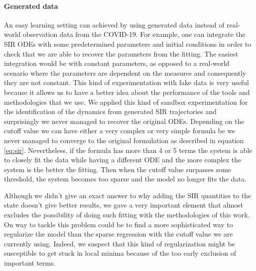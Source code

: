 \documentclass[12pt, letterpaper]{article}
\begin{document}
\paragraph{Generated data}

An easy learning setting can achieved by using generated data instead of real-world observation data from the COVID-19. 
For example, one can integrate the SIR ODEs with some predetermined parameters and initial conditions in order to check that we are able to recover the parameters from the fitting.
The easiest integration would be with constant parameters, as opposed to a real-world scenario where the parameters are dependent on the measures and consequently they are not constant.
This kind of experimentation with fake data is very useful because it allows us to have a better idea about the performance of the tools and methodologies that we use.
We applied this kind of sandbox experimentation for the identification of the dynamics from generated SIR trajectories and surprisingly we never managed to recover the original ODEs.
Depending on the cutoff value we can have either a very complex or very simple formula be we never managed to converge to the original formulation as described in equation \ref{eq:sir}. 
Nevertheless, if the formula has more than 4 or 5 terms the system is able to closely fit the data while having a different ODE and the more complex the system is the better the fitting.
Then when the cutoff value surpasses some threshold, the system becomes too sparse and the model no longer fits the data.

Although we didn't give an exact answer to why adding the SIR quantities to the state doesn't give better results, we gave a very important element that almost excludes the possibility of doing such fitting with the methodologies of this work. 
On way to tackle this problem could be to find a more sophisticated way to regularize the model than the sparse regression with the cutoff value we are currently using.
Indeed, we suspect that this kind of regularization might be susceptible to get stuck in local minima because of the too early exclusion of important terms.
\end{document}
